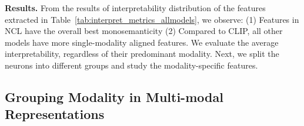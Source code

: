 \begin{table}[t]
    \centering
    \small
    \caption{\footnotesize The average interpretability scores for features extracted from the four models. A larger $|\Delta|$ represents that the features are more aligned with a single modality.}
    \vspace{-8mm}
    \label{tab:interpret_metrics_allmodels}
\end{table}

\textbf{Results.}
From the results of interpretability distribution of the features extracted in Table~\ref{tab:interpret_metrics_allmodels}, we observe:
(1) Features in NCL have the overall best monosemanticity (2) Compared to CLIP, all other models have more single-modality aligned features.
We evaluate the average interpretability, regardless of their predominant modality. Next, we split the neurons into different groups and study the modality-specific features.

\subsection{Grouping Modality in Multi-modal Representations}
